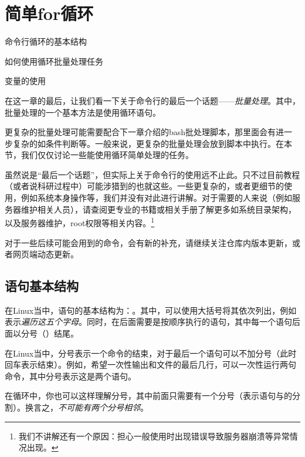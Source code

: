 \section{简单for循环}\label{sec:简单for循环}

\begin{Abstract}
    \item 命令行循环的基本结构
    \item 如何使用循环批量处理任务
    \item {}变量的使用
\end{Abstract}

在这一章的最后，让我们看一下关于命令行的最后一个话题——\emph{批量处理}。其中，批量处理的一个基本方法是使用循环语句。

\begin{attention}
    更复杂的批量处理可能需要配合下一章介绍的bash批处理脚本，那里面会有进一步复杂的如条件判断等。一般来说，更复杂的批量处理会放到脚本中执行。在本节，我们仅仅讨论一些能使用循环简单处理的任务。
\end{attention}

\begin{extend}
    虽然说是“最后一个话题”，但实际上关于命令行的使用远不止此。只不过目前教程（或者说科研过程中）可能涉猎到的也就这些。一些更复杂的，或者更细节的使用，例如系统本身操作等，我们并没有对此进行讲解。对于需要的人来说（例如服务器维护相关人员），请查阅更专业的书籍或相关手册了解更多如系统目录架构，以及服务器维护，root权限等相关内容。\footnote{我们不讲解还有一个原因：担心一般使用时出现错误导致服务器崩溃等异常情况出现。}
    
    对于一些后续可能会用到的命令，会有新的补充，请继续关注仓库内版本更新，或者网页端动态更新。
\end{extend}

\subsection{语句基本结构}\label{subsec:简单for循环-for语句基本结构}

在Linux当中，语句的基本结构为：。其中，\code{[列表范围]}可以使用大括号将其依次列出，例如表示\emph{遍历这五个字母}。同时，在后面需要是按顺序执行的语句，其中每一个语句后面以分号（\code{;}）结尾。

\begin{attention}
    在Linux当中，分号表示一个命令的结束，对于最后一个语句可以不加分号（此时回车表示结束）。例如，希望一次性输出和文件的最后几行，可以一次性运行两句命令，其中分号表示这是两个语句。

    在循环中，你也可以这样理解分号，其中前面只需要有一个分号（表示语句与的分割）。换言之，\emph{不可能有两个分号相邻}。
\end{attention}

